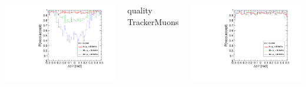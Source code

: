 \documentclass[compress]{beamer}
\begin{document}
\begin{frame}
\begin{columns}
\includegraphics[width=\linewidth]{barrel_dz_bypt_GlobalMuon.pdf}

\centering quality TrackerMuons

\includegraphics[width=\linewidth]{barrel_dz_bypt_TrackerMuon.pdf}
\end{columns}
\end{frame}

\end{document}
